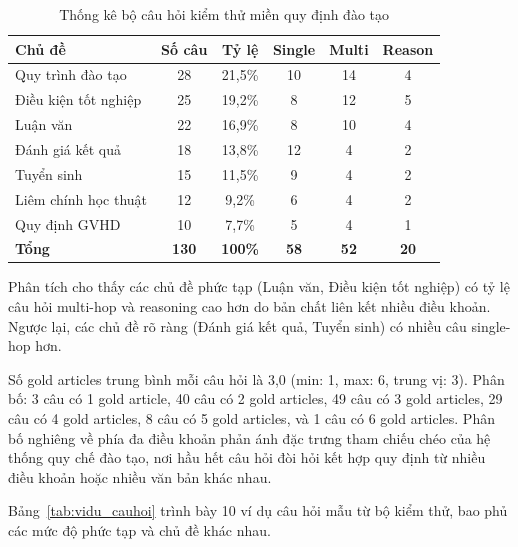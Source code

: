 \begin{table}[htbp]
    \centering
    \caption{Thống kê bộ câu hỏi kiểm thử miền quy định đào tạo}
    \label{tab:thongke_cauhoi}
    \begin{tabular}{lccccc}
        \toprule
        \textbf{Chủ đề} & \textbf{Số câu} & \textbf{Tỷ lệ}
          & \textbf{Single} & \textbf{Multi} & \textbf{Reason} \\
        \midrule
        Quy trình đào tạo       & 28 & 21,5\% & 10 & 14 & 4 \\
        Điều kiện tốt nghiệp    & 25 & 19,2\% &  8 & 12 & 5 \\
        Luận văn                & 22 & 16,9\% &  8 & 10 & 4 \\
        Đánh giá kết quả        & 18 & 13,8\% & 12 &  4 & 2 \\
        Tuyển sinh              & 15 & 11,5\% &  9 &  4 & 2 \\
        Liêm chính học thuật    & 12 &  9,2\% &  6 &  4 & 2 \\
        Quy định GVHD           & 10 &  7,7\% &  5 &  4 & 1 \\
        \midrule
        \textbf{Tổng}           & \textbf{130} & \textbf{100\%}
          & \textbf{58} & \textbf{52} & \textbf{20} \\
        \bottomrule
    \end{tabular}
\end{table}

Phân tích cho thấy các chủ đề phức tạp (Luận văn, Điều kiện tốt nghiệp) có tỷ lệ
câu hỏi multi-hop và reasoning cao hơn do bản chất liên kết nhiều điều khoản. Ngược
lại, các chủ đề rõ ràng (Đánh giá kết quả, Tuyển sinh) có nhiều câu single-hop hơn.

Số gold articles trung bình mỗi câu hỏi là 3,0 (min: 1, max: 6, trung vị: 3). Phân
bố: 3 câu có 1 gold article, 40 câu có 2 gold articles, 49 câu có 3 gold articles,
29 câu có 4 gold articles, 8 câu có 5 gold articles, và 1 câu có 6 gold articles.
Phân bố nghiêng về phía đa điều khoản phản ánh đặc trưng tham chiếu chéo của hệ
thống quy chế đào tạo, nơi hầu hết câu hỏi đòi hỏi kết hợp quy định từ nhiều
điều khoản hoặc nhiều văn bản khác nhau.

Bảng~\ref{tab:vidu_cauhoi} trình bày 10 ví dụ câu hỏi mẫu từ bộ kiểm thử, bao
phủ các mức độ phức tạp và chủ đề khác nhau.

